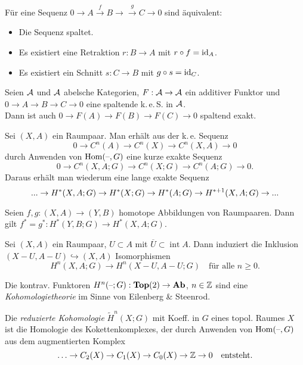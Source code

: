 \documentclass{cheat-sheet}
\newcommand{\RH}{\tilde{H}} %
\DeclareMathOperator{\inte}{int} %
\newcommand{\clos}[1]{\overline{#1}} %
\newcommand{\keS}{k.\,e.\,S.} %
\begin{document}
\begin{prop}
  Für eine Sequenz $0 \to A \xrightarrow{f} B \to \xrightarrow{g} C \to 0$ sind äquivalent:
  \begin{itemize}
    \item Die Sequenz spaltet.
    \item Es existiert eine Retraktion $r : B \to A$ mit $r \circ f = \operatorname{id}_A$.
    \item Es existiert ein Schnitt $s : C \to B$ mit $g \circ s = \operatorname{id}_C$.
  \end{itemize}
\end{prop}

\begin{prop}
  Seien $\mathcal{A}$ und $\mathcal{A}$ abelsche Kategorien, $F : \mathcal{A} \to \mathcal{A}$ ein additiver Funktor und $0 \to A \to B \to C \to 0$ eine spaltende \keS{} in $\mathcal{A}$.\\
  Dann ist auch $0 \to F(A) \to F(B) \to F(C) \to 0$ spaltend exakt.
\end{prop}

\begin{bem}
  Sei $(X, A)$ ein Raumpaar.
  Man erhält aus der k.\,e. Sequenz
  \[ 0 \to C^n(A) \to C^n(X) \to C^n(X, A) \to 0 \]
  durch Anwenden von $\operatorname{Hom}(\text{--}, G)$ eine kurze exakte Sequenz
  \[ 0 \to C^n(X, A; G) \to C^n(X; G) \to C^n(A; G) \to 0. \]
  Daraus erhält man wiederum eine lange exakte Sequenz
  \[ ... \to H^*(X, A; G) \to H^*(X; G) \to H^*(A; G) \to H^{*+1}(X, A; G) \to ... \]
\end{bem}

\begin{prop}
  Seien $f, g : (X, A) \to (Y, B)$ homotope Abbildungen von Raumpaaren. Dann gilt
  $f^* = g^* : H^*(Y, B; G) \to H^*(X, A; G)$.
\end{prop}

\begin{satz}
  Sei $(X, A)$ ein Raumpaar, $U \subset A$ mit $\clos{U} \subset \inte A$. Dann induziert die Inklusion $(X - U, A - U) \hookrightarrow (X, A)$ Isomorphismen
  \[ H^n(X, A; G) \to H^n(X - U, A - U; G) \quad \text{für alle $n \geq 0$.} \]
\end{satz}

\begin{bem}
  Die kontrav. Funktoren $H^n(\text{--}; G) : \mathbf{Top}(2) \to \mathbf{Ab}$, $n \in \mathbb{Z}$ sind eine \emph{Kohomologietheorie} im Sinne von Eilenberg \& Steenrod.
\end{bem}

\begin{defn}
  Die \emph{reduzierte Kohomologie} $\RH^n(X; G)$ mit Koeff. in $G$ eines topol. Raumes $X$ ist die Homologie des Kokettenkomplexes, der durch Anwenden von $\operatorname{Hom}(\text{--}, G)$ aus dem augmentierten Komplex
  \[
    \ldots \to C_2(X) \to C_1(X) \to C_0(X) \to \mathbb{Z} \to 0
    \quad \text{entsteht.}
  \]
\end{defn}
\end{document}
